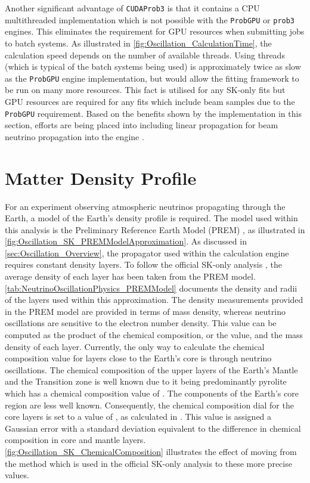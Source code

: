 Another significant advantage of \texttt{CUDAProb3} is that it contains a CPU multithreaded implementation which is not possible with the \texttt{ProbGPU} or \texttt{prob3} engines. This eliminates the requirement for GPU resources when submitting jobs to batch systems. As illustrated in \autoref{fig:Oscillation_CalculationTime}, the calculation speed depends on the number of available threads. Using  threads (which is typical of the batch systems being used) is approximately twice as slow as the \texttt{ProbGPU} engine implementation, but would allow the fitting framework to be run on many more resources. This fact is utilised for any SK-only fits but GPU resources are required for any fits which include beam samples due to the \texttt{ProbGPU} requirement. Based on the benefits shown by the implementation in this section, efforts are being placed into including linear propagation for beam neutrino propagation into the engine \cite{Liban}.

\section{Matter Density Profile}
\label{sec:Oscillation_MatterDensity}

For an experiment observing atmospheric neutrinos propagating through the Earth, a model of the Earth's density profile is required. The model used within this analysis is the Preliminary Reference Earth Model (PREM) \cite{Dziewonski1981-sp}, as illustrated in \autoref{fig:Oscillation_SK_PREMModelApproximation}. As discussed in \autoref{sec:Oscillation_Overview}, the propagator used within the calculation engine requires constant density layers. To follow the official SK-only analysis \cite{thesis_roger}, the average density of each layer has been taken from the PREM model. \autoref{tab:NeutrinoOscillationPhysics_PREMModel} documents the density and radii of the layers used within this approximation. The density measurements provided in the PREM model are provided in terms of mass density, whereas neutrino oscillations are sensitive to the electron number density. This value can be computed as the product of the chemical composition, or the  value, and the mass density of each layer. Currently, the only way to calculate the chemical composition value for layers close to the Earth's core is through neutrino oscillations. The chemical composition of the upper layers of the Earth's Mantle and the Transition zone is well known due to it being predominantly pyrolite which has a chemical composition value of  \cite{Bourret_2017}. The components of the Earth's core region are less well known. Consequently, the chemical composition dial for the core layers is set to a value of , as calculated in \cite{Rott2015}. This value is assigned a Gaussian error with a standard deviation equivalent to the difference in chemical composition in core and mantle layers. \autoref{fig:Oscillation_SK_ChemicalComposition} illustrates the effect of moving from the  method which is used in the official SK-only analysis \cite{thesis_roger} to these more precise values.

